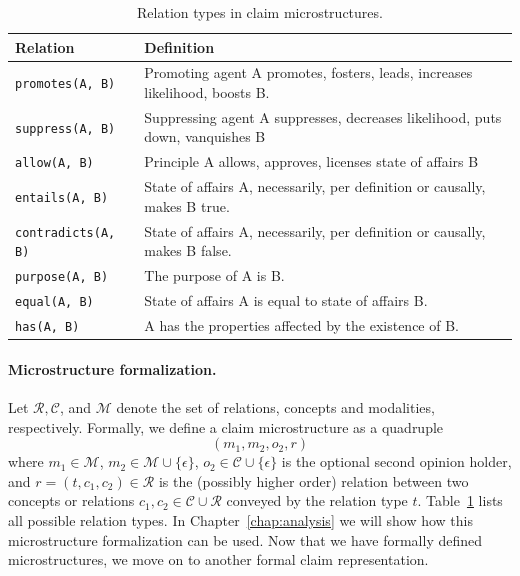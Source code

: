 \begin{table}
{\footnotesize
\begin{tabular}{lp{}}
\toprule
\textbf{Relation} & \textbf{Definition} \\
\midrule
\texttt{promotes(A, B)} & Promoting agent A promotes, fosters, leads, increases likelihood, boosts B.  \\
\texttt{suppress(A, B)} & Suppressing agent A suppresses, decreases likelihood, puts down, vanquishes B \\
\midrule
\texttt{allow(A, B)} & Principle A allows, approves, licenses state of affairs B \\
\midrule
\texttt{entails(A, B)} & State of affairs A, necessarily, per definition or causally, makes B true. \\
\texttt{contradicts(A, B)} & State of affairs A, necessarily, per definition or causally, makes B false. \\
\midrule
\texttt{purpose(A, B)} & The purpose of A is B. \\
\midrule
\texttt{equal(A, B)} & State of affairs A is equal to state of affairs B. \\
\midrule
\texttt{has(A, B)} & A has the properties affected by the existence of B.  \\
\bottomrule
\end{tabular}}
\caption{Relation types in claim microstructures.}
\label{tab:microstructures_relations}
\end{table}

\paragraph{Microstructure formalization. } Let $\mathcal{R}, \mathcal{C}$, and
$\mathcal{M}$ denote the set of relations, concepts and
modalities, respectively. 
Formally, we define a claim microstructure as a quadruple 
$$
(m_1, m_2, o_2, r)
$$ 
where $m_1 \in \mathcal{M}$, $m_2 \in \mathcal{M} \cup \{\epsilon\}$,
$o_2 \in \mathcal{C} \cup \{\epsilon\}$ is the optional second opinion holder, and 
$r = (t, c_1, c_2) \in \mathcal{R}$ is the (possibly higher order) relation 
between two concepts or relations $c_1, c_2 \in \mathcal{C} \cup \mathcal{R}$
conveyed by the relation type $t$.
Table~\ref{tab:microstructures_relations} lists all possible relation types. 
In Chapter~\ref{chap:analysis} we will show
how this microstructure formalization can be used. 
Now that we have formally defined microstructures, we move on to another
formal claim representation. 

